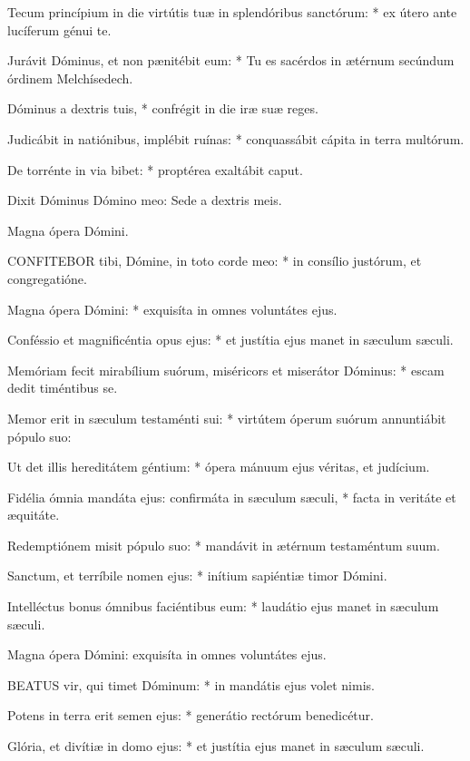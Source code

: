 Tecum princípium in die virtútis tuæ in splendóribus sanctórum: * ex útero ante lucíferum génui te.

Jurávit Dóminus, et non pænitébit eum: * Tu es sacérdos in ætérnum secúndum órdinem Melchísedech.

Dóminus a dextris tuis, * confrégit in die iræ suæ reges.

Judicábit in natiónibus, implébit ruínas: * conquassábit cápita in terra multórum.

De torrénte in via bibet: * proptérea exaltábit caput.

 Dixit Dóminus Dómino meo: Sede a dextris meis.

 Magna ópera Dómini.


\lettrine[lines=2]{C}{ONFITEBOR} tibi, Dómine, in toto corde meo: * in consílio justórum, et congregatióne.

Magna ópera Dómini: * exquisíta in omnes voluntátes ejus.

Conféssio et magnificéntia opus ejus: * et justítia ejus manet in sæculum sæculi.

Memóriam fecit mirabílium suórum, miséricors et miserátor Dóminus: * escam dedit timéntibus se.

Memor erit in sæculum testaménti sui: * virtútem óperum suórum annuntiábit pópulo suo:

Ut det illis hereditátem géntium: * ópera mánuum ejus véritas, et judícium.

Fidélia ómnia mandáta ejus: confirmáta in sæculum sæculi, * facta in veritáte et æquitáte.

Redemptiónem misit pópulo suo: * mandávit in ætérnum testaméntum suum.

Sanctum, et terríbile nomen ejus: * inítium sapiéntiæ timor Dómini.

Intelléctus bonus ómnibus faciéntibus eum: * laudátio ejus manet in sæculum sæculi.

 Magna ópera Dómini: exquisíta in omnes voluntátes ejus.


\lettrine[lines=2]{B}{EATUS} vir, qui timet Dóminum: * in mandátis ejus volet nimis.

Potens in terra erit semen ejus: * generátio rectórum benedicétur.

Glória, et divítiæ in domo ejus: * et justítia ejus manet in sæculum sæculi.


